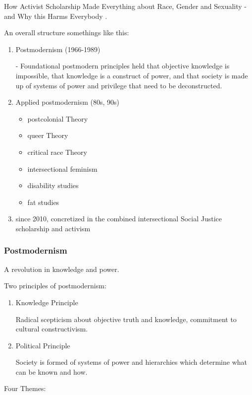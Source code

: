 \documentclass[10pt,titlepage]{book}
\begin{document}
How Activist Scholarship Made Everything about Race, Gender and Sexuality - and Why this Harms Everybody \cite{pluckrose-cynical}.

An overall structure somethings like this:

\begin{enumerate}

\item Postmodernism (1966-1989)

   - Foundational postmodern principles held that objective knowledge is impossible, that knowledge is a construct of power, and that society is made up of systems of power and privilege that need to be deconstructed.

\item Applied postmodernism (80s, 90s)

  \begin{itemize}
  \item postcolonial Theory
  \item queer Theory
  \item critical race Theory
  \item intersectional feminism
  \item disability studies
  \item fat studies
  \end{itemize}

\item since 2010, concretized in the combined intersectional Social Justice scholarship and activism
\end{enumerate}


\subsubsection{Postmodernism}
A revolution in knowledge and power.

Two principles of postmodernism:

\begin{enumerate}
\item Knowledge Principle

  Radical scepticism about objective truth and knowledge, commitment to cultural constructivism.
  
\item Political Principle

  Society is formed of systems of power and hierarchies which determine what can be known and how.
  \end{enumerate}

Four Themes:
\end{document}
